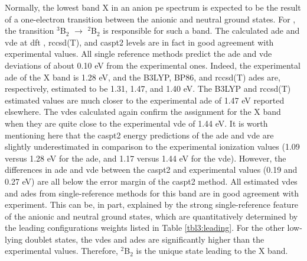 \begin{refsection}
Normally, the lowest band X in an anion \acrshort{pe} spectrum is expected to be the result of a one-electron transition between the anionic and neutral ground states. For , the transition $^3$B$_2$ $\longrightarrow$ $^2$B$_2$ is responsible for such a band. The calculated \acrshort{ade} and \acrshort{vde} at \acrshort{dft} , \acrshort{rccsd}(T), and \acrshort{caspt2} levels are in fact in good agreement with experimental values. All single reference methods predict the \acrshort{ade} and \acrshort{vde} deviations of about 0.10 eV from the experimental ones. Indeed, the experimental \acrshort{ade} of the X band is 1.28 eV, and the B3LYP, BP86, and \acrshort{rccsd}(T) \acrshort{ade}s are, respectively, estimated to be 1.31, 1.47, and 1.40 eV. The B3LYP and \acrshort{rccsd}(T) estimated values are much closer to the experimental \acrshort{ade} of 1.47 eV reported elsewhere. \cite{c3:16} The \acrshort{vde}s calculated again confirm the assignment for the X band when they are quite close to the experimental \acrshort{vde} of 1.44 eV. It is worth mentioning here that the \acrshort{caspt2} energy predictions of the \acrshort{ade} and \acrshort{vde} are slightly underestimated in comparison to the experimental ionization values (1.09 versus 1.28 eV for the \acrshort{ade}, and 1.17 versus 1.44 eV for the \acrshort{vde}). However, the differences in \acrshort{ade} and \acrshort{vde} between the \acrshort{caspt2} and experimental values (0.19 and 0.27 eV) are all below the error margin of the \acrshort{caspt2} method. All estimated \acrshort{vde}s and \acrshort{ade}s from single-reference methods for this band are in good agreement with experiment. This can be, in part, explained by the strong single-reference feature of the anionic and neutral ground states, which are quantitatively determined by the leading configurations weights listed in Table \ref{tbl3:leading}. For the other low-lying doublet states, the \acrshort{vde}s and \acrshort{ade}s are significantly higher than the experimental values. Therefore, $^2$B$_2$ is the unique state leading to the X band.







\end{refsection}
